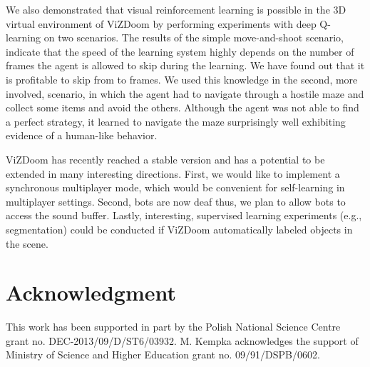 \documentclass[english,american,conference, balance]{IEEEtran}
\begin{document}
We also demonstrated that visual reinforcement learning is possible
in the 3D virtual environment of ViZDoom by performing experiments
with deep Q-learning on two scenarios. The results of the simple move-and-shoot
scenario, indicate that the speed of the learning system highly depends
on the number of frames the agent is allowed to skip during the learning.
We have found out that it is profitable to skip from  to 
frames. We used this knowledge in the second, more involved, scenario,
in which the agent had to navigate through a hostile maze and collect
some items and avoid the others. Although the agent was not able to
find a perfect strategy, it learned to navigate the maze surprisingly
well exhibiting evidence of a human-like behavior.

ViZDoom has recently reached a stable  version and has a potential
to be extended in many interesting directions. First, we would like
to implement a synchronous multiplayer mode, which would be convenient
for self-learning in multiplayer settings. Second, bots are now deaf
thus, we plan to allow bots to access the sound buffer. Lastly, interesting,
supervised learning experiments (e.g., segmentation) could be conducted
if ViZDoom automatically labeled objects in the scene.

\section*{Acknowledgment }

This work has been supported in part by the Polish National Science
Centre grant no. DEC-2013/09/D/ST6/03932. M. Kempka acknowledges the
support of Ministry of Science and Higher Education grant no. 09/91/DSPB/0602.



\end{document}
